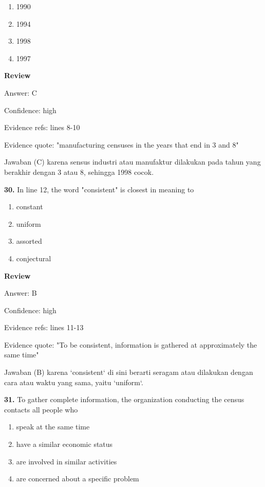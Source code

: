 \documentclass[12pt]{article}
\begin{document}
\begin{enumerate}[label=(\Alph*),leftmargin=*,itemsep=0.2em]
\item 1990
\item 1994
\item 1998
\item 1997
\end{enumerate}
\par
\begingroup
\setlength{\parskip}{0pt}
\setlength{\parindent}{0pt}
\textbf{Review}\par
Answer: C\par
Confidence: high\par
Evidence refs: lines 8-10\par
Evidence quote: "manufacturing censuses in the years that end in 3 and 8"\par
Jawaban (C) karena sensus industri atau manufaktur dilakukan pada tahun yang berakhir dengan 3 atau 8, sehingga 1998 cocok.\par
\endgroup
\par
\vspace{0.25\baselineskip}
\noindent\textbf{30.} In line 12, the word "consistent" is closest in meaning to
\begin{enumerate}[label=(\Alph*),leftmargin=*,itemsep=0.2em]
\item constant
\item uniform
\item assorted
\item conjectural
\end{enumerate}
\par
\begingroup
\setlength{\parskip}{0pt}
\setlength{\parindent}{0pt}
\textbf{Review}\par
Answer: B\par
Confidence: high\par
Evidence refs: lines 11-13\par
Evidence quote: "To be consistent, information is gathered at approximately the same time"\par
Jawaban (B) karena `consistent` di sini berarti seragam atau dilakukan dengan cara atau waktu yang sama, yaitu `uniform`.\par
\endgroup
\par
\vspace{0.25\baselineskip}
\noindent\textbf{31.} To gather complete information, the organization conducting the census contacts all people who
\begin{enumerate}[label=(\Alph*),leftmargin=*,itemsep=0.2em]
\item speak at the same time
\item have a similar economic status
\item are involved in similar activities
\item are concerned about a specific problem
\end{enumerate}
\end{document}
